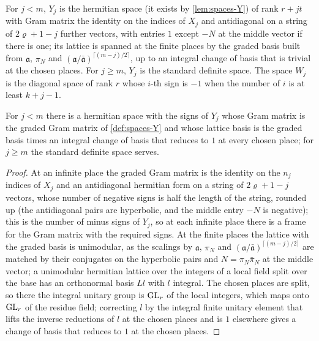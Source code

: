 \begin{definition}\label{def:spaces-Y}
For $j<m$, $Y_j$ is the hermitian space (it exists by \cref{lem:spaces-Y}) of rank $r+jt$ with Gram matrix the identity on the indices of
$X_j$ and antidiagonal on a string of $2\varrho+1-j$ further vectors, with entries $1$ except $-N$ at the
middle vector if there is one; its lattice is spanned at the finite places by the graded basis built from
$\mathfrak a$, $\pi_N$ and $(\mathfrak a/\bar{\mathfrak a})^{\lceil(m-j)/2\rceil}$, up to an integral change of
basis that is trivial at the chosen places. For $j\ge m$, $Y_j$ is the standard definite space. The space
$W_j$ is the diagonal space of rank $r$ whose $i$-th sign is $-1$ when the number of $i$ is at least
$k+j-1$.
\end{definition}

\begin{lemma}\label{lem:spaces-Y}
For $j<m$ there is a hermitian space with the signs of $Y_j$ whose Gram matrix is the graded Gram matrix of \cref{def:spaces-Y} and whose lattice basis is the graded basis times an integral change of basis that reduces to $1$ at every chosen place; for $j\ge m$ the standard definite space serves.
\end{lemma}

\begin{proof}
At an infinite place the graded Gram matrix is the identity on the $n_j$ indices of $X_j$ and an antidiagonal hermitian form on a string of $2\varrho+1-j$ vectors, whose number of negative signs is half the length of the string, rounded up (the antidiagonal pairs are hyperbolic, and the middle entry $-N$ is negative); this is the number of
minus signs of $Y_j$, so at each infinite place there is a frame for the Gram matrix with the required signs. At the finite places the lattice with the graded basis is unimodular, as the scalings by $\mathfrak a$, $\pi_N$ and $(\mathfrak a/\bar{\mathfrak a})^{\lceil(m-j)/2\rceil}$ are matched by their conjugates on the hyperbolic pairs and $N=\pi_N\bar\pi_N$ at the
middle vector; a unimodular hermitian lattice over the integers of a local field split over the base has an orthonormal basis $Ll$ with $l$ integral. The chosen places are split, so there the integral unitary group is $\operatorname{GL}_r$ of the local integers, which maps onto $\operatorname{GL}_r$ of the residue field; correcting $l$ by the integral finite unitary element that lifts the inverse reductions of $l$ at the chosen places and is $1$ elsewhere gives a change of basis that reduces to $1$
at the chosen places.
\end{proof}

